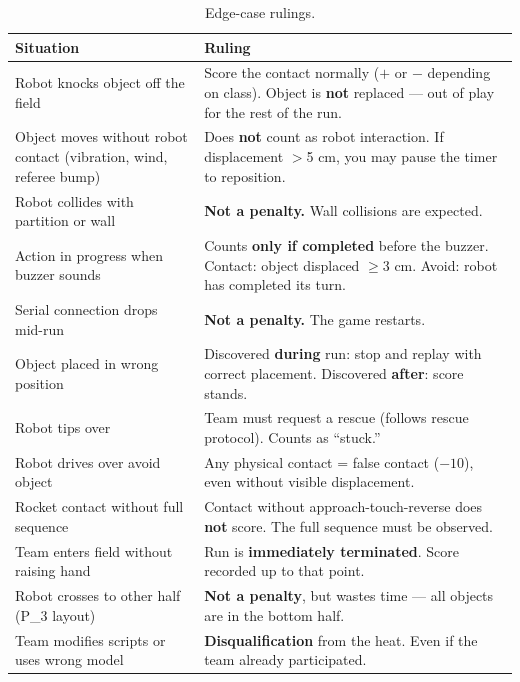 \documentclass[a4]{article}
\begin{document}
\begin{table}[H]
\centering
\begin{tabular}{p{5.5cm}p{8.5cm}}
\toprule
\textbf{Situation} & \textbf{Ruling} \\
\midrule
Robot knocks object off the field & Score the contact normally ($+$ or $-$ depending on class). Object is \textbf{not} replaced --- out of play for the rest of the run. \\
\addlinespace
Object moves without robot contact (vibration, wind, referee bump) & Does \textbf{not} count as robot interaction. If displacement $>$5 cm, you may pause the timer to reposition. \\
\addlinespace
Robot collides with partition or wall & \textbf{Not a penalty.} Wall collisions are expected. \\
\addlinespace
Action in progress when buzzer sounds & Counts \textbf{only if completed} before the buzzer. Contact: object displaced $\geq$3 cm. Avoid: robot has completed its turn. \\
\addlinespace
Serial connection drops mid-run & \textbf{Not a penalty.} The game restarts. \\
\addlinespace
Object placed in wrong position & Discovered \textbf{during} run: stop and replay with correct placement. Discovered \textbf{after}: score stands. \\
\addlinespace
Robot tips over & Team must request a rescue (follows rescue protocol). Counts as ``stuck.'' \\
\addlinespace
Robot drives over avoid object & Any physical contact = false contact ($-10$), even without visible displacement. \\
\addlinespace
Rocket contact without full sequence & Contact without approach-touch-reverse does \textbf{not} score. The full sequence must be observed. \\
\addlinespace
Team enters field without raising hand & Run is \textbf{immediately terminated}. Score recorded up to that point. \\
\addlinespace
Robot crosses to other half (P\_3 layout) & \textbf{Not a penalty}, but wastes time --- all objects are in the bottom half. \\
\addlinespace
Team modifies scripts or uses wrong model & \textbf{Disqualification} from the heat. Even if the team already participated. \\
\bottomrule
\end{tabular}
\caption{Edge-case rulings.}
\end{table}
\end{document}
